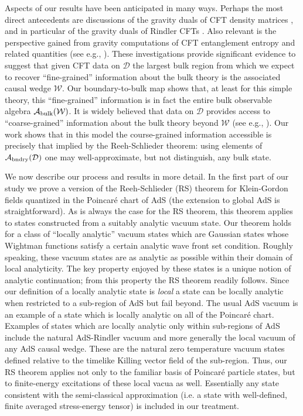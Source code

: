 \documentclass[12pt]{article}
\numberwithin{equation}{section}
\def\cD{{\mathcal{D}}}
\def\cW{\mathcal{W}}
\def\cAbulk{{\mathcal{A}_{\rm bulk}}}
\def\cAbndry{{\mathcal{A}_{\rm bndry}}}
\begin{document}
Aspects of our results have been anticipated in many ways. 
Perhaps the most direct antecedents are discussions of the 
gravity duals of CFT density matrices \cite{Czech:2012bh,Bousso:2012sj}, 
and in particular of the gravity duals of Rindler CFTs
\cite{Emparan:1999gf,Czech:2012be,Parikh:2012kg,Bousso:2012mh}.
Also relevant is the perspective gained from gravity computations
of CFT entanglement entropy \cite{Ryu:2006bv,Hubeny:2007aa,Lewkowycz:2013nqa,
  Faulkner:2013ana} and related quantities (see e.g.,
\cite{Hubeny:2012wa,Casini:2009aa,Hayden:2011ag,Morrison:2012ab,
  Wall:2012uf,Hartman:2013qma,Blanco:2013joa,Kelly:2013aja}).
These investigations provide significant evidence to suggest that
given CFT data on $\cD$ the largest bulk region from which 
we expect to recover ``fine-grained'' information about the bulk theory 
is the associated causal wedge $\cW$. Our boundary-to-bulk map
shows that, at least for this simple theory, this ``fine-grained'' 
information is
in fact the entire bulk observable algebra $\cAbulk(\cW)$.
It is widely believed that data on $\cD$ provides access to
``coarse-grained'' information about the bulk theory beyond $\cW$
(see e.g., \cite{Kraus:2002iv,Fidkowski:2004aa,Hubeny:2006yu,Hubeny:2012ry}).
Our work shows that in this model the course-grained information
accessible is precisely that implied by the Reeh-Schlieder theorem: using 
elements of $\cAbndry(\cD)$ one may well-approximate, but not distinguish, 
any bulk state.


We now describe our process and results in more detail.
In the first part of our study we prove a version of the 
Reeh-Schlieder (RS) theorem for Klein-Gordon fields quantized in the 
Poincar\'e chart of AdS
(the extension to global AdS is straightforward).
As is always the case for the RS theorem, this theorem applies
to states constructed from a suitably analytic vacuum state. 
Our theorem holds for a class of ``locally analytic'' vacuum states 
which are Gaussian states whose Wightman functions satisfy a 
certain analytic wave front set condition. Roughly speaking, these 
vacuum states 
are as analytic as possible within their domain of local analyticity.
The key property enjoyed by these states is a unique notion of
analytic continuation; from this property the RS theorem readily follows.
Since our definition of a locally analytic state is \emph{local} a state
can be locally analytic when restricted to a sub-region of AdS but
fail beyond. 
The usual AdS vacuum is an example of a state which is locally analytic 
on all of the Poincar\'e chart.
Examples of states which are locally analytic only within sub-regions
of AdS include the natural AdS-Rindler vacuum and more generally
the local vacuum of any AdS causal wedge.
These are the natural zero temperature vacuum states defined 
relative to the timelike Killing vector field of the sub-region.
Thus, our RS theorem applies not only to the familiar basis of 
Poincar\'e particle states, but to finite-energy excitations of
these local vacua as well. Essentially any state consistent with
the semi-classical approximation (i.e. a state with well-defined,
finite averaged stress-energy tensor) is included in our
treatment.
\end{document}
